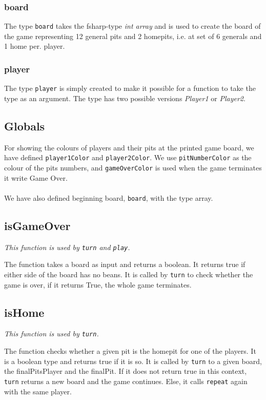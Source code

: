 \documentclass[a4paper]{report}
\begin{document}
\subsubsection*{board}
The type \texttt{board} takes the fsharp-type \textsl{int array} and is used to create the board of the game representing 12 general pits and 2 homepits, i.e. at set of 6 generals and 1 home per. player.

\subsubsection*{player}
The type \texttt{player} is simply created to make it possible for a function to take the type as an argument. The type has two possible versions \textsl{Player1} or \textsl{Player2}.
\subsection*{Globals}
For showing the colours of players and their pits at the printed game board, we have defined \texttt{player1Color} and \texttt{player2Color}. We use \texttt{pitNumberColor} as the colour of the pits numbers, and \texttt{gameOverColor} is used when the game terminates it write Game Over.
\\\\
We have also defined beginning board, \texttt{board}, with the type array.

\subsection*{isGameOver}
{\it This function is used by \texttt{turn} and \texttt{play}.}

The function takes a board as input and returns a boolean. It returns true if either side of the board has no beans. It is called by \texttt{turn} to check whether the game is over, if it returns True, the whole game terminates.

\subsection*{isHome} 
{\it This function is used by \texttt{turn}.}

The function checks whether a given pit is the homepit for one of the players. It is a boolean type and returns true if it is so.
It is called by \texttt{turn} to a given board, the finalPitsPlayer and the finalPit. If it does not return true in this context, \texttt{turn} returns a new board and the game continues. Else, it calls \texttt{repeat} again with the same player.
\end{document}
